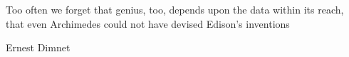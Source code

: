 %

Too often we forget that genius, too, depends upon the data within its reach, that even Archimedes could not have devised Edison’s inventions 

\bigskip

Ernest Dimnet

%

